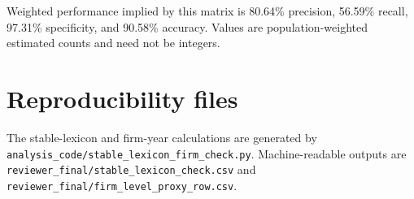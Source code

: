 \documentclass[11pt]{article}
\begin{document}
Weighted performance implied by this matrix is 80.64\% precision, 56.59\%
recall, 97.31\% specificity, and 90.58\% accuracy. Values are population-weighted
estimated counts and need not be integers.

\section{Reproducibility files}

The stable-lexicon and firm-year calculations are generated by
\texttt{analysis\_code/stable\_lexicon\_firm\_check.py}. Machine-readable
outputs are \texttt{reviewer\_final/stable\_lexicon\_check.csv} and
\texttt{reviewer\_final/firm\_level\_proxy\_row.csv}.
\end{document}
